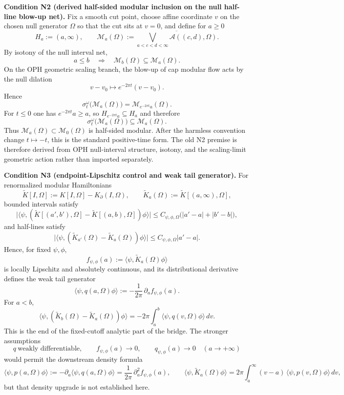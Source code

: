 \textbf{Condition N2 (derived half-sided modular inclusion on the null half-line blow-up net).} Fix a smooth cut point, choose affine coordinate \(v\) on the chosen null generator \(\Omega\) so that the cut sits at \(v=0\), and define for \(a\ge 0\)
\[
H_a:=(a,\infty),
\qquad
\mathcal M_a(\Omega)
:=
\overline{\bigvee_{a<c<d<\infty}\mathcal A((c,d),\Omega)}.
\]
By isotony of the null interval net,
\[
a\le b
\quad\Longrightarrow\quad
\mathcal M_b(\Omega)\subseteq \mathcal M_a(\Omega).
\]
On the OPH geometric scaling branch, the blow-up of cap modular flow acts by the null dilation
\[
v-v_0\mapsto e^{-2\pi t}(v-v_0).
\]
Hence
\[
\sigma_t^\omega\bigl(\mathcal M_a(\Omega)\bigr)
=
\mathcal M_{e^{-2\pi t}a}(\Omega).
\]
For \(t\le 0\) one has \(e^{-2\pi t}a\ge a\), so \(H_{e^{-2\pi t}a}\subseteq H_a\) and therefore
\[
\sigma_t^\omega\bigl(\mathcal M_a(\Omega)\bigr)\subseteq \mathcal M_a(\Omega).
\]
Thus \(\mathcal M_a(\Omega)\subset \mathcal M_0(\Omega)\) is half-sided modular. After the harmless convention change \(t\mapsto -t\), this is the standard positive-time form. The old N2 premise is therefore derived from OPH null-interval structure, isotony, and the scaling-limit geometric action rather than imported separately.

\textbf{Condition N3 (endpoint-Lipschitz control and weak tail generator).} For renormalized modular Hamiltonians
\[
\widetilde K[I,\Omega]
:=
K[I,\Omega]-K_\partial(I,\Omega),
\qquad
\widetilde K_a(\Omega):=\widetilde K[(a,\infty),\Omega],
\]
bounded intervals satisfy
\[
\bigl|
\langle\psi,(\widetilde K[(a',b'),\Omega]-\widetilde K[(a,b),\Omega])\phi\rangle
\bigr|
\le
C_{\psi,\phi,\Omega}\bigl(|a'-a|+|b'-b|\bigr),
\]
and half-lines satisfy
\[
\bigl|
\langle\psi,(\widetilde K_{a'}(\Omega)-\widetilde K_a(\Omega))\phi\rangle
\bigr|
\le
C_{\psi,\phi,\Omega}|a'-a|.
\]
Hence, for fixed \(\psi,\phi\),
\[
f_{\psi,\phi}(a):=\langle\psi,\widetilde K_a(\Omega)\phi\rangle
\]
is locally Lipschitz and absolutely continuous, and its distributional derivative defines the weak tail generator
\[
\langle\psi,q(a,\Omega)\phi\rangle
:=
-\frac{1}{2\pi}\,\partial_a f_{\psi,\phi}(a).
\]
For \(a<b\),
\[
\langle\psi,(\widetilde K_b(\Omega)-\widetilde K_a(\Omega))\phi\rangle
=
-2\pi\int_a^b \langle\psi,q(v,\Omega)\phi\rangle\,dv.
\]
This is the end of the fixed-cutoff analytic part of the bridge. The stronger assumptions
\[
q \ \text{weakly differentiable},
\qquad
f_{\psi,\phi}(a)\to 0,
\qquad
q_{\psi,\phi}(a)\to 0
\quad (a\to+\infty)
\]
would permit the downstream density formula
\[
\langle\psi,p(a,\Omega)\phi\rangle
:=
-\partial_a\langle\psi,q(a,\Omega)\phi\rangle
=
\frac{1}{2\pi}\,\partial_a^2 f_{\psi,\phi}(a),
\qquad
\langle\psi,\widetilde K_a(\Omega)\phi\rangle
=
2\pi\int_a^\infty (v-a)\,\langle\psi,p(v,\Omega)\phi\rangle\,dv,
\]
but that density upgrade is not established here.

